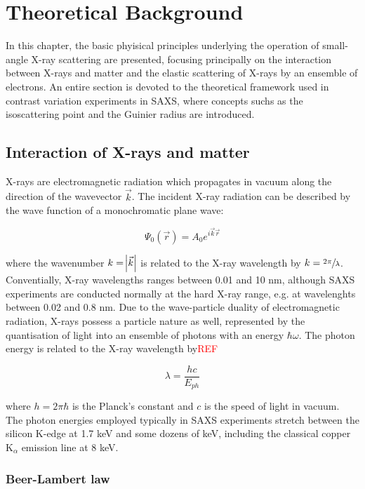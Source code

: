 \chapter{Theoretical Background}
\label{chap:theory_SAXS}
In this chapter, the basic phyisical principles underlying the operation of small-angle X-ray scattering are presented, focusing principally on the interaction between X-rays and matter and the elastic scattering of X-rays by an ensemble of electrons. An entire section is devoted to the theoretical framework used in contrast variation experiments in SAXS, where concepts suchs as the isoscattering point and the Guinier radius are introduced.

\section{Interaction of X-rays and matter}

X-rays are electromagnetic radiation which propagates in vacuum along the direction of the wavevector $\vec{k}$. The incident X-ray radiation can be described by the wave function of a monochromatic plane wave:

\begin{equation}
        \label{eq:IncidentWave}
        \Psi_0\left( \vec{r} \right)=A_0 e^{i \vec{k}\vec{r} }
\end{equation}

where the wavenumber $k=\abs{\vec{k}}$ is related to the X-ray wavelength by $k=\sfrac{2\pi}{\lambda}$. Conventially, X-ray wavelengths ranges between 0.01 and 10 nm, although SAXS experiments are conducted normally at the hard X-ray range, e.g. at wavelenghts between 0.02 and 0.8 nm. Due to the wave-particle duality of electromagnetic radiation, X-rays possess a particle nature as well, represented by the quantisation of light into an ensemble of photons with an energy $\hbar \omega$. The photon energy is related to the X-ray wavelength by\textcolor{red}{REF}

\begin{equation}
        \lambda = \frac{h c}{E_{ph}}
\end{equation}

where $h=2\pi\hbar$ is the Planck's constant and $c$ is the speed of light in vacuum. The photon energies employed typically in SAXS experiments stretch between the silicon K-edge at 1.7 keV and some dozens of keV, including the classical copper K$_{\alpha}$ emission line at 8 keV.

\subsection{Beer-Lambert law}
\label{sec:BeerLambert}


